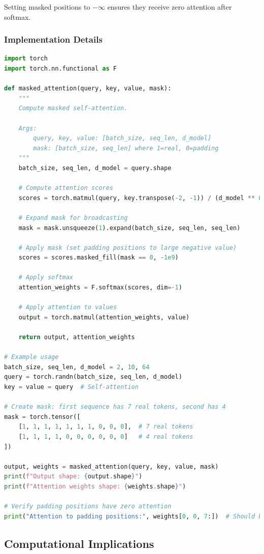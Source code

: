 Setting masked positions to $-\infty$ ensures they receive zero attention after softmax.

\subsubsection{Implementation Details}
\begin{lstlisting}[language=Python, caption=Attention Masking]
import torch
import torch.nn.functional as F

def masked_attention(query, key, value, mask):
    """
    Compute masked self-attention.
    
    Args:
        query, key, value: [batch_size, seq_len, d_model]
        mask: [batch_size, seq_len] where 1=real, 0=padding
    """
    batch_size, seq_len, d_model = query.shape
    
    # Compute attention scores
    scores = torch.matmul(query, key.transpose(-2, -1)) / (d_model ** 0.5)
    
    # Expand mask for broadcasting
    mask = mask.unsqueeze(1).expand(batch_size, seq_len, seq_len)
    
    # Apply mask (set padding positions to large negative value)
    scores = scores.masked_fill(mask == 0, -1e9)
    
    # Apply softmax
    attention_weights = F.softmax(scores, dim=-1)
    
    # Apply attention to values
    output = torch.matmul(attention_weights, value)
    
    return output, attention_weights

# Example usage
batch_size, seq_len, d_model = 2, 10, 64
query = torch.randn(batch_size, seq_len, d_model)
key = value = query  # Self-attention

# Create mask: first sequence has 7 real tokens, second has 4
mask = torch.tensor([
    [1, 1, 1, 1, 1, 1, 1, 0, 0, 0],  # 7 real tokens
    [1, 1, 1, 1, 0, 0, 0, 0, 0, 0]   # 4 real tokens
])

output, weights = masked_attention(query, key, value, mask)
print(f"Output shape: {output.shape}")
print(f"Attention weights shape: {weights.shape}")

# Verify padding positions have zero attention
print("Attention to padding positions:", weights[0, 0, 7:])  # Should be ~0
\end{lstlisting}

\subsection{Computational Implications}

